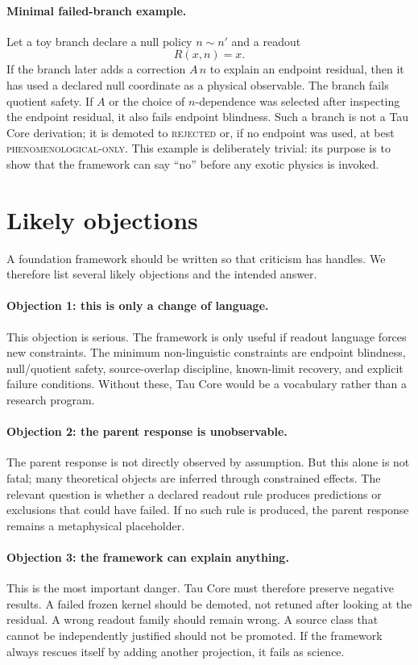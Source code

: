 \documentclass[11pt]{article}
\begin{document}
\paragraph{Minimal failed-branch example.}
Let a toy branch declare a null policy \(n\sim n'\) and a readout
\[
  R(x,n)=x.
\]
If the branch later adds a correction \(A\,n\) to explain an endpoint residual,
then it has used a declared null coordinate as a physical observable.  The
branch fails quotient safety.  If \(A\) or the choice of \(n\)-dependence was
selected after inspecting the endpoint residual, it also fails endpoint
blindness.  Such a branch is not a Tau Core derivation; it is demoted to
\textsc{rejected} or, if no endpoint was used, at best
\textsc{phenomenological-only}.  This example is deliberately trivial: its
purpose is to show that the framework can say ``no'' before any exotic physics
is invoked.

\section{Likely objections}

A foundation framework should be written so that criticism has handles.  We
therefore list several likely objections and the intended answer.

\paragraph{Objection 1: this is only a change of language.}
This objection is serious.  The framework is only useful if readout language
forces new constraints.  The minimum non-linguistic constraints are endpoint
blindness, null/quotient safety, source-overlap discipline, known-limit
recovery, and explicit failure conditions.  Without these, Tau Core would be a
vocabulary rather than a research program.

\paragraph{Objection 2: the parent response is unobservable.}
The parent response is not directly observed by assumption.  But this alone is
not fatal; many theoretical objects are inferred through constrained effects.
The relevant question is whether a declared readout rule produces predictions
or exclusions that could have failed.  If no such rule is produced, the parent
response remains a metaphysical placeholder.

\paragraph{Objection 3: the framework can explain anything.}
This is the most important danger.  Tau Core must therefore preserve negative
results.  A failed frozen kernel should be demoted, not retuned after looking
at the residual.  A wrong readout family should remain wrong.  A source class
that cannot be independently justified should not be promoted.  If the
framework always rescues itself by adding another projection, it fails as
science.
\end{document}
